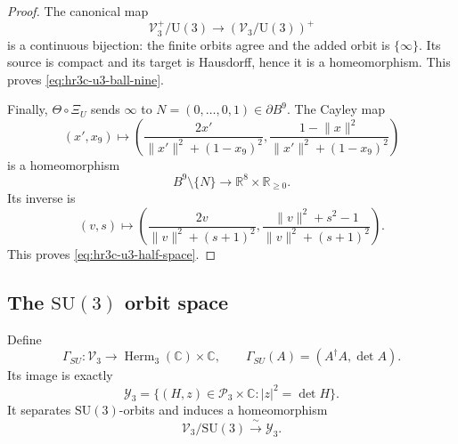 \begin{proof}
The canonical map
\[
 \mathscr V_3^+/\mathrm U(3)
 \longrightarrow
 (\mathscr V_3/\mathrm U(3))^+
\]
is a continuous bijection: the finite orbits agree and the added orbit is
\(\{\infty\}\).  Its source is compact and its target is Hausdorff, hence
it is a homeomorphism.  This proves
\eqref{eq:hr3c-u3-ball-nine}.

Finally, \(\Theta\circ\Xi_U\) sends \(\infty\) to
\(N=(0,\ldots,0,1)\in\partial B^9\).  The Cayley map
\begin{equation}
 (x',x_9)\longmapsto
 \left(
 \frac{2x'}{\lVert x'\rVert^2+(1-x_9)^2},
 \frac{1-\lVert x\rVert^2}
 {\lVert x'\rVert^2+(1-x_9)^2}
 \right)
 \label{eq:hr3c-cayley-map}
\end{equation}
is a homeomorphism
\[
 B^9\setminus\{N\}\longrightarrow
 \mathbb R^8\times\mathbb R_{\geq0}.
\]
Its inverse is
\begin{equation}
 (v,s)\longmapsto
 \left(
 \frac{2v}{\lVert v\rVert^2+(s+1)^2},
 \frac{\lVert v\rVert^2+s^2-1}
 {\lVert v\rVert^2+(s+1)^2}
 \right).
 \label{eq:hr3c-cayley-inverse}
\end{equation}
This proves \eqref{eq:hr3c-u3-half-space}.
\end{proof}

\subsection{The \texorpdfstring{\(\mathrm{SU}(3)\)}{SU(3)} orbit space}
\label{subsec:hr3c-su3}

\begin{theorem}
\label{thm:hr3c-su3-invariants}
Define
\begin{equation}
 \Gamma_{SU}:\mathscr V_3\longrightarrow
 \operatorname{Herm}_3(\mathbb C)\times\mathbb C,
 \qquad
 \Gamma_{SU}(A)=(A^\dagger A,\det A).
 \label{eq:hr3c-su-invariant-map}
\end{equation}
Its image is exactly
\begin{equation}
 \mathcal Y_3=
 \{(H,z)\in\mathcal P_3\times\mathbb C:
 |z|^2=\det H\}.
 \label{eq:hr3c-su-invariant-image}
\end{equation}
It separates \(\mathrm{SU}(3)\)-orbits and induces a homeomorphism
\begin{equation}
 \mathscr V_3/\mathrm{SU}(3)\xrightarrow{\ \sim\ }\mathcal Y_3.
 \label{eq:hr3c-su-quotient}
\end{equation}
\end{theorem}

